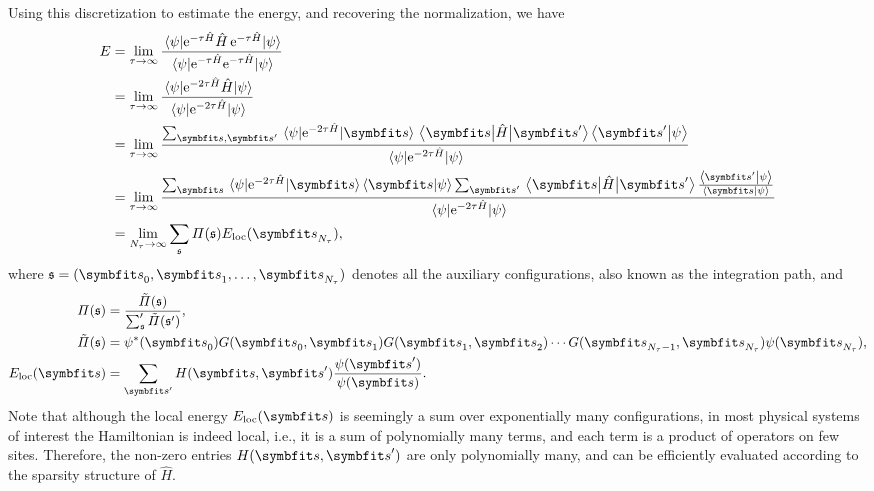 Using this discretization to estimate the energy, and recovering the normalization, we have
\begin{align}
E &= \lim_{\tau \to \infty} \frac{\ev{\rme^{-\tau \hat{H}} \hat{H}\,\rme^{-\tau \hat{H}}}{\psiinit}}{\ev{\rme^{-\tau \hat{H}} \rme^{-\tau \hat{H}}}{\psiinit}} \\
&= \lim_{\tau \to \infty} \frac
{\ev{\rme^{-2 \tau \hat{H}} \hat{H}}{\psiinit}}
{\ev{\rme^{-2 \tau \hat{H}}}{\psiinit}} \label{eq:pimc-commute} \\
&= \lim_{\tau \to \infty} \frac
{\sum_{\vs, \vs'} \mel{\psiinit}{\rme^{-2 \tau \hat{H}}}{\vs} \mel{\vs}{\hat{H}}{\vs'} \ip{\vs'}{\psiinit}}
{\ev{\rme^{-2 \tau \hat{H}}}{\psiinit}} \\
&= \lim_{\tau \to \infty} \frac
{\sum_\vs \mel{\psiinit}{\rme^{-2 \tau \hat{H}}}{\vs} \ip{\vs}{\psiinit} \sum_{\vs'} \mel{\vs}{\hat{H}}{\vs'} \frac{\ip{\vs'}{\psiinit}}{\ip{\vs}{\psiinit}}}
{\ev{\rme^{-2 \tau \hat{H}}}{\psiinit}} \\
&= \lim_{N_\tau \to \infty} \sum_\svs \varPi(\svs) E_\text{loc}(\vs_{N_\tau}), \label{eq:pimc}
\end{align}
where $\svs = (\vs_0, \vs_1, \ldots, \vs_{N_\tau})$ denotes all the auxiliary configurations, also known as the integration path, and
\begin{align}
\varPi(\svs) &= \frac{\tilde{\varPi}(\svs)}{\sum_\svs' \tilde{\varPi}(\svs')}, \\
\tilde{\varPi}(\svs) &= \psiinit^*(\vs_0) G(\vs_0, \vs_1) G(\vs_1, \vs_2) \cdots G(\vs_{N_\tau - 1}, \vs_{N_\tau}) \psiinit(\vs_{N_\tau}), \label{eq:pimc-pi} \\
E_\text{loc}(\vs) &= \sum_{\vs'} H(\vs, \vs') \frac{\psiinit(\vs')}{\psiinit(\vs)}.
\end{align}
Note that although the local energy $E_\text{loc}(\vs)$ is seemingly a sum over exponentially many configurations, in most physical systems of interest the Hamiltonian is indeed local, i.e., it is a sum of polynomially many terms, and each term is a product of operators on few sites. Therefore, the non-zero entries $H(\vs, \vs')$ are only polynomially many, and can be efficiently evaluated according to the sparsity structure of $\hat{H}$.

